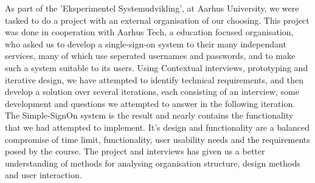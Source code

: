 As part of the 'Eksperimentel Systemudvikling', at Aarhus University,
we were tasked to do a project with an external organisation of our choosing.
This project was done in cooperation with Aarhus Tech, a education focused organisation, 
who asked us to develop a single-sign-on system to their many independant services, 
many of which use seperated usernames and passwords, and to make such a system suitable to its users.
Using Contextual interviews, prototyping and iterative design, 
we have attempted to identify technical requirements, 
and then develop a solution over several iterations, each consisting of an interview, 
some development and questions we attempted to answer in the following iteration.
The Simple-SignOn system is the result 
and nearly contains the functionality that we had attempted to implement.
It's design and functionality are a balanced compromise of time limit, functionality, 
user usability needs and the requirements posed by the course.
The project and interviews has given us a better understanding of 
methods for analysing organisation structure, design methods and user interaction.
